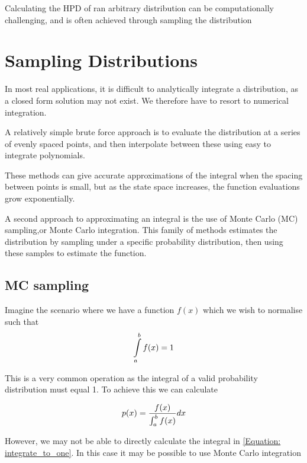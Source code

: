 Calculating the HPD of ran arbitrary distribution can be computationally challenging, and is often achieved through sampling the distribution



\section{Sampling Distributions}

In most real applications, it is difficult to analytically integrate a distribution, as a closed form solution may not exist. 
We therefore have to resort to numerical integration. 

A relatively simple brute force approach is to evaluate the distribution at a series of evenly spaced points, and then interpolate between these using easy to integrate polynomials. 

These methods can give accurate approximations of the integral when the spacing between points is small, but as the state space increases, the function evaluations grow exponentially.

A second approach to approximating an integral is the use of Monte Carlo (MC) sampling,or Monte Carlo integration. 
This family of methods estimates the distribution by sampling under a specific probability distribution, then using these samples to estimate the function. 



\subsection{MC sampling}


Imagine the scenario where we have a function $f(x)$ which we wish to normalise such that 
\begin{equation}\label{Equation: integrate_to_one} 
\int\limits_a^b{f(x)}=1 
\end{equation}

This is a very common operation as the integral of a valid probability distribution must equal 1. 
To achieve this we can calculate 

\begin{equation}\label{Equation: divide_by_integral} 
p(x)=\dfrac{f(x) } {\int _{a}^{b}f(x)} dx
\end{equation}

However, we may not be able to directly calculate the integral in \eqref{Equation: integrate_to_one}. 
In this case it may be possible to use Monte Carlo integration

